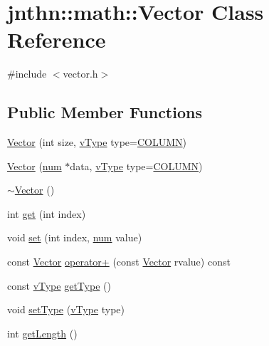 \hypertarget{classjnthn_1_1math_1_1Vector}{\section{jnthn\-:\-:math\-:\-:Vector Class Reference}
\label{classjnthn_1_1math_1_1Vector}
}


{\ttfamily \#include $<$vector.\-h$>$}

\subsection*{Public Member Functions}
\begin{DoxyCompactItemize}
\item 
\hyperlink{classjnthn_1_1math_1_1Vector_af2d199ef0c0d93168399cee3afb6dbfe}{Vector} (int size, \hyperlink{vector_8cpp_a65603216afa9e90437684d0557b6ecb3}{v\-Type} type=\hyperlink{vector_8cpp_a65603216afa9e90437684d0557b6ecb3ac5a3a4f3774bc6aff01acdbd9862a1a9}{C\-O\-L\-U\-M\-N})
\item 
\hyperlink{classjnthn_1_1math_1_1Vector_aff6df5703baab149feb10e6194e4ae62}{Vector} (\hyperlink{namespacejnthn_1_1math_a5d3a263452a9caabf22cbb66cec013e9}{num} $\ast$data, \hyperlink{vector_8cpp_a65603216afa9e90437684d0557b6ecb3}{v\-Type} type=\hyperlink{vector_8cpp_a65603216afa9e90437684d0557b6ecb3ac5a3a4f3774bc6aff01acdbd9862a1a9}{C\-O\-L\-U\-M\-N})
\item 
\hyperlink{classjnthn_1_1math_1_1Vector_a5a10aeadba061bca5d7adc45e1f0235d}{$\sim$\-Vector} ()
\item 
int \hyperlink{classjnthn_1_1math_1_1Vector_a29884418c42955e7f56561dae258727c}{get} (int index)
\item 
void \hyperlink{classjnthn_1_1math_1_1Vector_acd54269987bb1256ff3d65caba26b042}{set} (int index, \hyperlink{namespacejnthn_1_1math_a5d3a263452a9caabf22cbb66cec013e9}{num} value)
\item 
const \hyperlink{classjnthn_1_1math_1_1Vector}{Vector} \hyperlink{classjnthn_1_1math_1_1Vector_aedd5b6c15e1c323610c9843fa799d95f}{operator+} (const \hyperlink{classjnthn_1_1math_1_1Vector}{Vector} rvalue) const 
\item 
const \hyperlink{vector_8cpp_a65603216afa9e90437684d0557b6ecb3}{v\-Type} \hyperlink{classjnthn_1_1math_1_1Vector_aca060c98d44054aa10f5de8986a3a7ad}{get\-Type} ()
\item 
void \hyperlink{classjnthn_1_1math_1_1Vector_a4a11e9a32e7d48a5a0993456da0dce63}{set\-Type} (\hyperlink{vector_8cpp_a65603216afa9e90437684d0557b6ecb3}{v\-Type} type)
\item 
int \hyperlink{classjnthn_1_1math_1_1Vector_a1e58c0bbe1e20521275e4bacac1d4d6a}{get\-Length} ()
\end{DoxyCompactItemize}


